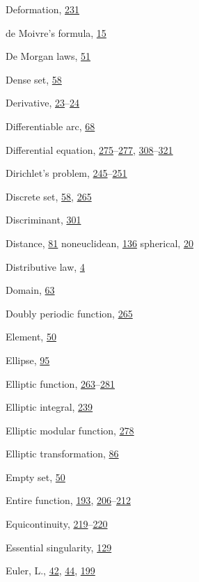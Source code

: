 \begin{theindex}
\item Deformation, \hyperlink{orig-p231}{231}
\item de Moivre's formula, \hyperlink{orig-p15}{15}
\item De Morgan laws, \hyperlink{orig-p51}{51}
\item Dense set, \hyperlink{orig-p58}{58}
\item Derivative, \hyperlink{orig-p23}{23}--\hyperlink{orig-p24}{24}
\item Differentiable arc, \hyperlink{orig-p68}{68}
\item Differential equation, \hyperlink{orig-p275}{275}--\hyperlink{orig-p277}{277}, \hyperlink{orig-p308}{308}--\hyperlink{orig-p321}{321}
\item Dirichlet's problem, \hyperlink{orig-p245}{245}--\hyperlink{orig-p251}{251}
\item Discrete set, \hyperlink{orig-p58}{58}, \hyperlink{orig-p265}{265}
\item Discriminant, \hyperlink{orig-p301}{301}
\item Distance, \hyperlink{orig-p81}{81}
\subitem noneuclidean, \hyperlink{orig-p136}{136}
\subitem spherical, \hyperlink{orig-p20}{20}
\item Distributive law, \hyperlink{orig-p4}{4}
\item Domain, \hyperlink{orig-p63}{63}
\item Doubly periodic function, \hyperlink{orig-p265}{265}
\item Element, \hyperlink{orig-p50}{50}
\item Ellipse, \hyperlink{orig-p95}{95}
\item Elliptic function, \hyperlink{orig-p263}{263}--\hyperlink{orig-p281}{281}
\item Elliptic integral, \hyperlink{orig-p239}{239}
\item Elliptic modular function, \hyperlink{orig-p278}{278}
\item Elliptic transformation, \hyperlink{orig-p86}{86}
\item Empty set, \hyperlink{orig-p50}{50}
\item Entire function, \hyperlink{orig-p193}{193}, \hyperlink{orig-p206}{206}--\hyperlink{orig-p212}{212}
\item Equicontinuity, \hyperlink{orig-p219}{219}--\hyperlink{orig-p220}{220}
\item Essential singularity, \hyperlink{orig-p129}{129}
\item Euler, L., \hyperlink{orig-p42}{42}, \hyperlink{orig-p44}{44}, \hyperlink{orig-p199}{199}

\end{theindex}
